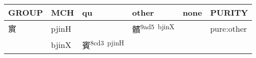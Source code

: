 \documentclass[14pt,a4paper]{scrartcl}
\begin{document}
\begin{longtable}[c]{@{}llllll@{}}
\toprule
\begin{minipage}[b]{0.14\columnwidth}\raggedright\strut
GROUP
\strut\end{minipage} &
\begin{minipage}[b]{0.14\columnwidth}\raggedright\strut
MCH
\strut\end{minipage} &
\begin{minipage}[b]{0.14\columnwidth}\raggedright\strut
qu
\strut\end{minipage} &
\begin{minipage}[b]{0.14\columnwidth}\raggedright\strut
other
\strut\end{minipage} &
\begin{minipage}[b]{0.14\columnwidth}\raggedright\strut
none
\strut\end{minipage} &
\begin{minipage}[b]{0.14\columnwidth}\raggedright\strut
PURITY
\strut\end{minipage}\tabularnewline
\midrule
\endhead
\begin{minipage}[t]{0.14\columnwidth}\raggedright\strut
賔
\strut\end{minipage} &
\begin{minipage}[t]{0.14\columnwidth}\raggedright\strut
pjinH
\strut\end{minipage} &
\begin{minipage}[t]{0.14\columnwidth}\raggedright\strut
\strut\end{minipage} &
\begin{minipage}[t]{0.14\columnwidth}\raggedright\strut
髕\textsuperscript{9ad5~bjinX}
\strut\end{minipage} &
\begin{minipage}[t]{0.14\columnwidth}\raggedright\strut
\strut\end{minipage} &
\begin{minipage}[t]{0.14\columnwidth}\raggedright\strut
pure:other
\strut\end{minipage}\tabularnewline
\begin{minipage}[t]{0.14\columnwidth}\raggedright\strut
𡧍
\strut\end{minipage} &
\begin{minipage}[t]{0.14\columnwidth}\raggedright\strut
bjinX
\strut\end{minipage} &
\begin{minipage}[t]{0.14\columnwidth}\raggedright\strut
賓\textsuperscript{8cd3~pjinH}
\strut\end{minipage} &

\end{longtable}
\end{document}
